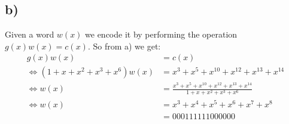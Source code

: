 \documentclass{article}
\begin{document}
\subsection*{b)}
Given a word $w(x)$ we encode it by performing the operation $g(x)w(x)=c(x)$.  So from a) we get:
\begin{align*}
g(x)w(x)&=c(x)\\
\iff(1+x+x^2+x^3+x^6)w(x)&=x^3+x^5+x^10+x^12+x^13+x^14\\
\iff w(x)&=\frac{x^3+x^5+x^10+x^12+x^13+x^14}{1+x+x^2+x^3+x^6}\\
\iff w(x)&=x^3+x^4+x^5+x^6+x^7+x^8\\
&=000111111000000\\
\end{align*}
\end{document}
